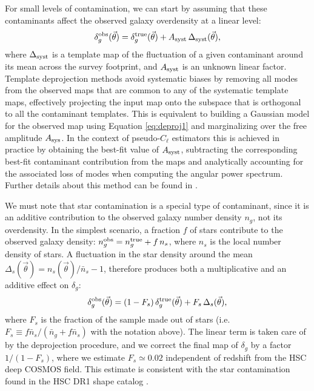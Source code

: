 \documentclass[a4paper,11pt]{article}
\newcommand{\nv}{\vec{\theta}}
\begin{document}
    For small levels of contamination, we can start by assuming that these contaminants affect the observed galaxy overdensity at a linear level:
    \begin{equation}\label{eq:deproj1}
      \delta_g^{\rm obs}(\nv) = \delta_g^{\rm true}(\nv) + A_{\rm syst}\,\Delta_{\rm syst}(\nv),
    \end{equation}
    where $\Delta_{\rm syst}$ is a template map of the fluctuation of a given contaminant around its mean across the survey footprint, and $A_{\rm syst}$ is an unknown linear factor. Template deprojection methods avoid systematic biases by removing all modes from the observed maps that are common to any of the systematic template maps, effectively projecting the input map onto the subspace that is orthogonal to all the contaminant templates. This is equivalent to building a Gaussian model for the observed map using Equation \ref{eq:deproj1} and marginalizing over the free amplitude $A_{\rm sys}$. In the context of pseudo-$C_\ell$ estimators this is achieved in practice by obtaining the best-fit value of $A_{\rm syst}$, subtracting the corresponding best-fit contaminant contribution from the maps and analytically accounting for the associated loss of modes when computing the angular power spectrum. Further details about this method can be found in \cite{2017MNRAS.465.1847E,2019MNRAS.484.4127A}.
    
    We must note that star contamination is a special type of contaminant, since it is an additive contribution to the observed galaxy number density $n_g$, not its overdensity. In the simplest scenario, a fraction $f$ of stars contribute to the observed galaxy density: $n_g^{\rm obs}=n^{\rm true}_g+f\,n_s$, where $n_s$ is the local number density of stars. A fluctuation in the star density around the mean $\Delta_s(\nv)=n_s(\nv)/\bar{n}_s-1$, therefore produces both a multiplicative and an additive effect on $\delta_g$:
    \begin{equation}
      \delta_g^{\rm obs}(\nv) = (1-F_s)\,\delta_g^{\rm true}(\nv)+F_s\,\Delta_s(\nv),
    \end{equation}
    where $F_s$ is the fraction of the sample made out of stars (i.e. $F_s\equiv f\bar{n}_s/(\bar{n}_g+f\bar{n}_s)$ with the notation above). The linear term is taken care of by the deprojection procedure, and we correct the final map of $\delta_g$ by a factor $1/(1-F_s)$, where we estimate $F_s\simeq0.02$ independent of redshift from the HSC deep COSMOS field. This estimate is consistent with the star contamination found in the HSC DR1 shape catalog \citep{2018PASJ...70S..25M}.
\end{document}
